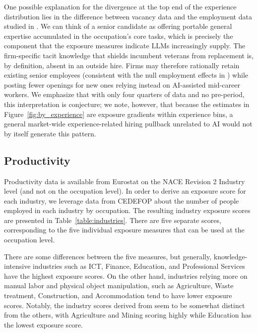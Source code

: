 \documentclass[11pt]{article}
\begin{document}
One possible explanation for the divergence at the top end of the experience distribution lies in the difference between vacancy data and the employment data studied in \citet{brynjolfsson2025canaries}. We can think of a senior candidate as offering portable general expertise accumulated in the occupation's core tasks, which is precisely the component that the exposure measures indicate LLMs increasingly supply. The firm-specific tacit knowledge that shields incumbent veterans from replacement is, by definition, absent in an outside hire. Firms may therefore rationally retain existing senior employees (consistent with the null employment effects in \citet{brynjolfsson2025canaries}) while posting fewer openings for new ones relying instead on AI-assisted mid-career workers. We emphasize that with only four quarters of data and no pre-period, this interpretation is conjecture; we note, however, that because the estimates in Figure~\ref{fig:by_experience} are exposure gradients within experience bins, a general market-wide experience-related hiring pullback unrelated to AI would not by itself generate this pattern.

\subsection{Productivity}

Productivity data is available from Eurostat on the NACE Revision 2 Industry level (and not on the occupation level). In order to derive an exposure score for each industry, we leverage data from CEDEFOP about the number of people employed in each industry by occupation. The resulting industry exposure scores are presented in Table~\ref{table:industries}. There are five separate scores, corresponding to the five individual exposure measures that can be used at the occupation level.

There are some differences between the five measures, but generally, knowledge-intensive industries such as ICT, Finance, Education, and Professional Services have the highest exposure scores. On the other hand, industries relying more on manual labor and physical object manipulation, such as Agriculture, Waste treatment, Construction, and Accommodation tend to have lower exposure scores. Notably, the industry scores derived from \citet{webb_impact_2022} seem to be somewhat distinct from the others, with Agriculture and Mining scoring highly while Education has the lowest exposure score.
\end{document}
